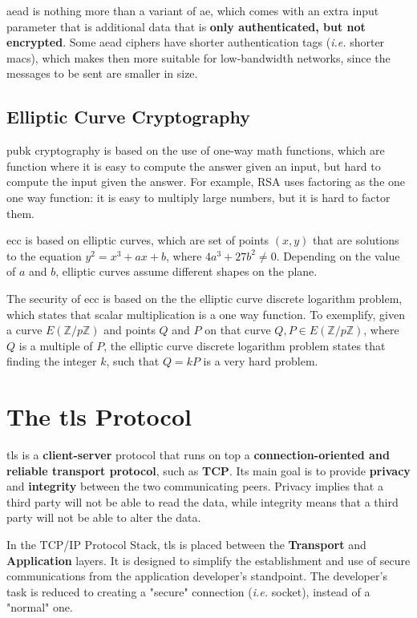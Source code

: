 \documentclass{llncs}
\begin{document}
{\gls{aead} is nothing more than a variant of \gls{ae}, which comes with an extra
input parameter that is additional data that is \textbf{only authenticated, but not encrypted}.
Some \gls{aead} ciphers have shorter authentication tags (\textit{i.e.} shorter \gls{mac}s),
which makes then more suitable for low-bandwidth networks, since the messages to be sent are smaller in size.

\subsection{Elliptic Curve Cryptography}

\gls{pubk} cryptography is based on the use of one-way math functions,
which are function where it is easy to compute the answer given an input,
but hard to compute the input given the answer. For example, RSA uses factoring
as the one one way function: it is easy to multiply large numbers, but it is hard
to factor them.

\gls{ecc} is based on elliptic curves, which are set of points $(x,y)$ that are
solutions to the equation $y^2 = x^3 + ax + b$, where $4a^3 + 27b^2 \neq 0$.
Depending on the value of $a$ and $b$, elliptic curves assume different shapes
on the plane.

The security of \gls{ecc} is based on the the elliptic curve discrete logarithm
problem, which states that scalar multiplication is a one way function. To exemplify,
given a curve $E(\mathbb{Z}/p\mathbb{Z})$ and points $Q$ and $P$ on that curve
$Q,P \in E(\mathbb{Z}/p\mathbb{Z})$, where $Q$ is a multiple of $P$, the elliptic curve discrete logarithm problem
states that finding the integer $k$, such that $Q=kP$ is a very hard problem.

\section{The \gls{tls} Protocol}

\gls{tls} is a \textbf{client-server} protocol
that runs on top a \textbf{connection-oriented and reliable transport protocol},
such as \textbf{TCP}. Its main goal is to provide \textbf{privacy} and \textbf{integrity}
between the two communicating peers. Privacy implies that a third party will not
be able to read the data, while integrity means that a third party will not be
able to alter the data.

In the TCP/IP Protocol Stack, \gls{tls} is placed between the \textbf{Transport}
and \textbf{Application} layers. It is designed to simplify the establishment
and use of secure communications from the application developer's standpoint.
The developer's task is reduced to creating a "secure" connection (\textit{i.e.} socket), instead of a "normal" one.

}
\end{document}
